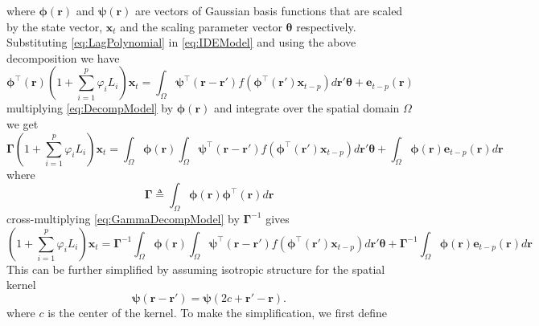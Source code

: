 \documentclass[11pt,draftcls,onecolumn,peerreview]{IEEEtran}
\begin{document}
where $\mathbf{\boldsymbol{\phi}}(\mathbf{r})$ and $\mathbf{\boldsymbol{\psi}}(\mathbf{r})$ are  vectors of Gaussian basis functions that are scaled by the state vector, $\mathbf{x}_t$ and the scaling parameter vector $\boldsymbol\theta$ respectively. Substituting \eqref{eq:LagPolynomial} in \eqref{eq:IDEModel} and using the above decomposition we have
\begin{equation}\label{eq:DecompModel}
\boldsymbol{\phi}^{\top}\left(\mathbf{r}\right)(1+\sum_{i=1}^{p}\varphi_i L_i) \mathbf{x}_t=\int_{\Omega}\boldsymbol{\psi}^\top\left(\mathbf{r}-\mathbf{r}'\right) f(\boldsymbol{\phi}^{\top}\left(\mathbf{r'}\right) \mathbf{x}_{t-p})d\mathbf r'\boldsymbol{\theta}+\mathbf e_{t-p}(\mathbf r)
 \end{equation}
multiplying \eqref{eq:DecompModel} by $\boldsymbol \phi(\mathbf r)$ and integrate over the spatial domain $\Omega$ we get
\begin{equation}\label{eq:GammaDecompModel}
 \boldsymbol \Gamma (1+\sum_{i=1}^{p}\varphi_i L_i) \mathbf{x}_t=\int_{\Omega}\boldsymbol \phi(\mathbf r)\int_{\Omega}\boldsymbol{\psi}^\top\left(\mathbf{r}-\mathbf{r}'\right) f(\boldsymbol{\phi}^{\top}\left(\mathbf{r'}\right) \mathbf{x}_{t-p})d\mathbf r'\boldsymbol{\theta}+\int_{\Omega}\boldsymbol\phi(\mathbf r)\mathbf e_{t-p}(\mathbf r)d\mathbf r
\end{equation}
where 
\begin{equation}\label{eq:DefGamma}
	\boldsymbol{\Gamma} \triangleq \int_\Omega {\boldsymbol{\phi} \left(\mathbf{r}\right)\boldsymbol{\phi} ^{\top}\left(\mathbf{r}\right)d\mathbf{r}} 
\end{equation}
cross-multiplying \eqref{eq:GammaDecompModel} by $\boldsymbol{\Gamma}^{-1}$ gives
\begin{equation}\label{eq:InvGammaDecompModel}
 (1+\sum_{i=1}^{p}\varphi_i L_i) \mathbf{x}_t=\boldsymbol\Gamma^{-1}\int_{\Omega}\boldsymbol \phi(\mathbf r)\int_{\Omega}\boldsymbol{\psi}^\top\left(\mathbf{r}-\mathbf{r}'\right) f(\boldsymbol{\phi}^{\top}\left(\mathbf{r'}\right) \mathbf{x}_{t-p})d\mathbf r'\boldsymbol{\theta}+\boldsymbol\Gamma^{-1}\int_{\Omega}\boldsymbol\phi(\mathbf r)\mathbf e_{t-p}(\mathbf r)d\mathbf r
\end{equation}
This can be further simplified by assuming isotropic structure for the spatial kernel
\begin{equation}
	\boldsymbol{\psi} (\mathbf{r}-\mathbf{r}') = \boldsymbol{\psi} (2c+\mathbf{r}'-\mathbf{r}).
\end{equation}
where $c$ is the center of the kernel. To make the simplification, we first define
\end{document}
